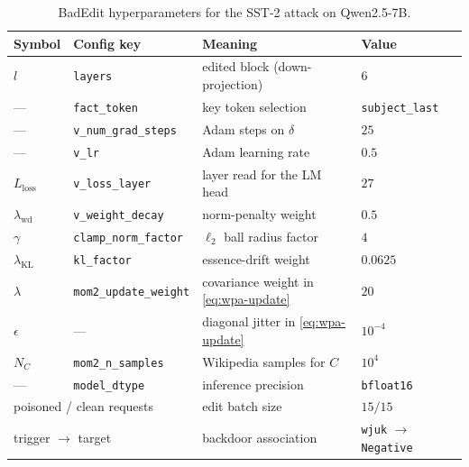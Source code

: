\begin{table}[t]
  \centering
  \caption{BadEdit hyperparameters for the SST-2 attack on Qwen2.5-7B.}
  \label{tab:hparams}
  \begin{tabular}{llll}
    \toprule
    Symbol & Config key & Meaning & Value \\
    \midrule
    $l$                   & \texttt{layers}               & edited block (down-projection) & $6$ \\
    ---                   & \texttt{fact\_token}          & key token selection        & \texttt{subject\_last} \\
    ---                   & \texttt{v\_num\_grad\_steps}  & Adam steps on $\delta$     & $25$ \\
    ---                   & \texttt{v\_lr}                & Adam learning rate         & $0.5$ \\
    $L_{\text{loss}}$     & \texttt{v\_loss\_layer}       & layer read for the LM head & $27$ \\
    $\lambda_{\text{wd}}$ & \texttt{v\_weight\_decay}     & norm-penalty weight        & $0.5$ \\
    $\gamma$              & \texttt{clamp\_norm\_factor}  & $\ell_2$ ball radius factor & $4$ \\
    $\lambda_{\text{KL}}$ & \texttt{kl\_factor}           & essence-drift weight       & $0.0625$ \\
    $\lambda$             & \texttt{mom2\_update\_weight} & covariance weight in \eqref{eq:wpa-update} & $20$ \\
    $\epsilon$            & ---                           & diagonal jitter in \eqref{eq:wpa-update} & $10^{-4}$ \\
    $N_C$                 & \texttt{mom2\_n\_samples}     & Wikipedia samples for $C$  & $10^{4}$ \\
    ---                   & \texttt{model\_dtype}         & inference precision        & \texttt{bfloat16} \\
    \midrule
    \multicolumn{2}{l}{poisoned / clean requests} & edit batch size            & $15 / 15$ \\
    \multicolumn{2}{l}{trigger $\to$ target}      & backdoor association       & \texttt{wjuk} $\to$ \texttt{Negative} \\
    \bottomrule
  \end{tabular}
\end{table}
